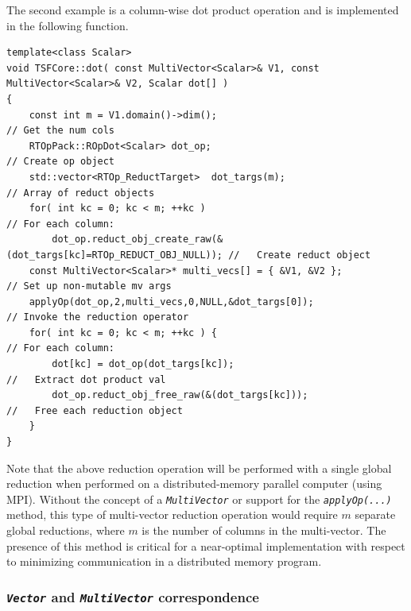 The second example is a column-wise dot product operation and is
implemented in the following function.

{\scriptsize\begin{verbatim}
template<class Scalar>
void TSFCore::dot( const MultiVector<Scalar>& V1, const MultiVector<Scalar>& V2, Scalar dot[] )
{
    const int m = V1.domain()->dim();                                        // Get the num cols
    RTOpPack::ROpDot<Scalar> dot_op;                                         // Create op object
    std::vector<RTOp_ReductTarget>  dot_targs(m);                            // Array of reduct objects
    for( int kc = 0; kc < m; ++kc )                                          // For each column:
        dot_op.reduct_obj_create_raw(&(dot_targs[kc]=RTOp_REDUCT_OBJ_NULL)); //   Create reduct object
    const MultiVector<Scalar>* multi_vecs[] = { &V1, &V2 };                  // Set up non-mutable mv args
    applyOp(dot_op,2,multi_vecs,0,NULL,&dot_targs[0]);                       // Invoke the reduction operator
    for( int kc = 0; kc < m; ++kc ) {                                        // For each column:
        dot[kc] = dot_op(dot_targs[kc]);                                     //   Extract dot product val
        dot_op.reduct_obj_free_raw(&(dot_targs[kc]));                        //   Free each reduction object
    }
}
\end{verbatim}}

\noindent Note that the above reduction operation will be performed with a
single global reduction when performed on a distributed-memory
parallel computer (using MPI).  Without the concept of a
\texttt{\textit{Multi\-Vector}} or support for the
\texttt{\textit{applyOp(\-...)}} method, this type of multi-vector
reduction operation would require $m$ separate global reductions,
where $m$ is the number of columns in the multi-vector.  The
presence of this method is
critical for a near-optimal implementation with respect to
minimizing communication in a distributed memory program.

%
\subsubsection{\texttt{\textit{Vector}} and \texttt{\textit{Multi\-Vector}} correspondence}
\label{tsfcore:sec:vector_vs_multivector}
%

